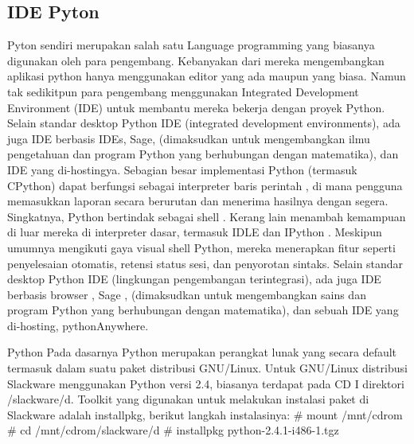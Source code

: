 \subsection{IDE Pyton}
	Pyton sendiri merupakan salah satu Language programming yang biasanya digunakan oleh para pengembang. Kebanyakan dari mereka mengembangkan aplikasi python hanya menggunakan editor yang ada maupun yang biasa. Namun tak sedikitpun para pengembang menggunakan Integrated Development Environment (IDE) untuk membantu mereka bekerja dengan proyek Python. Selain standar desktop Python IDE (integrated development environments), ada juga IDE berbasis IDEs, Sage, (dimaksudkan untuk mengembangkan ilmu pengetahuan dan program Python yang berhubungan dengan matematika), dan IDE yang di-hostingya.
	Sebagian besar implementasi Python (termasuk CPython) dapat berfungsi sebagai interpreter baris perintah , di mana pengguna memasukkan laporan secara berurutan dan menerima hasilnya dengan segera. Singkatnya, Python bertindak sebagai shell . Kerang lain menambah kemampuan di luar mereka di interpreter dasar, termasuk IDLE dan IPython . Meskipun umumnya mengikuti gaya visual shell Python, mereka menerapkan fitur seperti penyelesaian otomatis, retensi status sesi, dan penyorotan sintaks.
	Selain standar desktop Python IDE (lingkungan pengembangan terintegrasi), ada juga IDE berbasis browser , Sage , (dimaksudkan untuk mengembangkan sains dan program Python yang berhubungan dengan matematika), dan sebuah IDE yang di-hosting, pythonAnywhere. \cite{van2007python}

 Python Pada dasarnya Python merupakan perangkat lunak yang secara default termasuk dalam suatu paket distribusi GNU/Linux. Untuk GNU/Linux distribusi Slackware menggunakan Python versi 2.4, biasanya terdapat pada CD I direktori /slackware/d. Toolkit yang digunakan untuk melakukan instalasi paket di Slackware adalah installpkg, berikut langkah instalasinya:
  # mount /mnt/cdrom 
  # cd /mnt/cdrom/slackware/d 
  # installpkg python-2.4.1-i486-1.tgz \cite{utamipemrograman}

